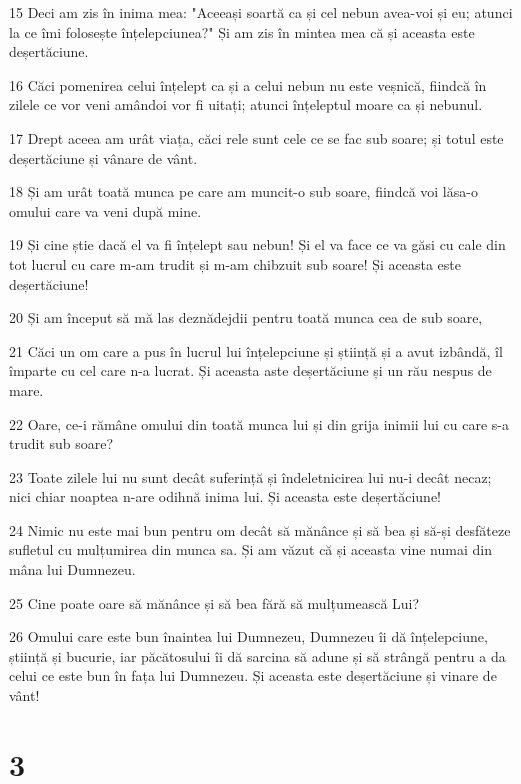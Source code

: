 \par 15 Deci am zis în inima mea: "Aceeași soartă ca și cel nebun avea-voi și eu; atunci la ce îmi folosește înțelepciunea?" Și am zis în mintea mea că și aceasta este deșertăciune.
\par 16 Căci pomenirea celui înțelept ca și a celui nebun nu este veșnică, fiindcă în zilele ce vor veni amândoi vor fi uitați; atunci înțeleptul moare ca și nebunul.
\par 17 Drept aceea am urât viața, căci rele sunt cele ce se fac sub soare; și totul este deșertăciune și vânare de vânt.
\par 18 Și am urât toată munca pe care am muncit-o sub soare, fiindcă voi lăsa-o omului care va veni după mine.
\par 19 Și cine știe dacă el va fi înțelept sau nebun! Și el va face ce va găsi cu cale din tot lucrul cu care m-am trudit și m-am chibzuit sub soare! Și aceasta este deșertăciune!
\par 20 Și am început să mă las deznădejdii pentru toată munca cea de sub soare,
\par 21 Căci un om care a pus în lucrul lui înțelepciune și știință și a avut izbândă, îl împarte cu cel care n-a lucrat. Și aceasta aste deșertăciune și un rău nespus de mare.
\par 22 Oare, ce-i rămâne omului din toată munca lui și din grija inimii lui cu care s-a trudit sub soare?
\par 23 Toate zilele lui nu sunt decât suferință și îndeletnicirea lui nu-i decât necaz; nici chiar noaptea n-are odihnă inima lui. Și aceasta este deșertăciune!
\par 24 Nimic nu este mai bun pentru om decât să mănânce și să bea și să-și desfăteze sufletul cu mulțumirea din munca sa. Și am văzut că și aceasta vine numai din mâna lui Dumnezeu.
\par 25 Cine poate oare să mănânce și să bea fără să mulțumească Lui?
\par 26 Omului care este bun înaintea lui Dumnezeu, Dumnezeu îi dă înțelepciune, știință și bucurie, iar păcătosului îi dă sarcina să adune și să strângă pentru a da celui ce este bun în fața lui Dumnezeu. Și aceasta este deșertăciune și vinare de vânt!

\chapter{3}

